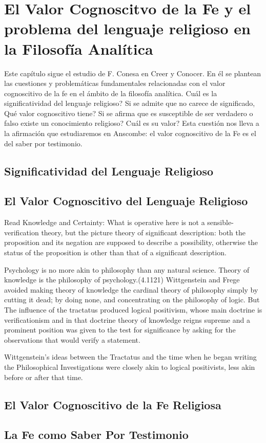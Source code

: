 \documentclass[../main.tex]{subfiles}
\begin{document}
\chapter{El Valor Cognoscitvo de la Fe y el problema del lenguaje religioso en la Filosofía Analítica}



Este capítulo sigue el estudio de F. Conesa en Creer y Conocer. En él se plantean las cuestiones y problemáticas fundamentales relacionadas con el valor cognoscitivo de la fe en el ámbito de la filosofía analítica.  \textquestiondown{}Cuál es la significatividad del lenguaje religioso? Si se admite que no carece de significado, \textquestiondown{}Qué valor cognoscitivo tiene? Si se afirma que es susceptible de ser verdadero o falso \textquestiondown{}existe un conocimiento religioso? \textquestiondown{}Cuál es su valor? Esta cuestión nos lleva a la afirmación que estudiaremos en Anscombe: el valor cognoscitivo de la Fe es el del saber por testimonio.


\section{Significatividad del Lenguaje Religioso}

\section{El Valor Cognoscitivo del Lenguaje Religioso}

Read Knowledge and Certainty:
What is operative here is not a sensible-verification theory, but the picture theory of significant description: both the proposition and its negation are supposed to describe a possibility, otherwise the status of the proposition is other than that of a significant description.

Psychology is no more akin to philosophy than any natural science. Theory of knowledge is the philosophy of psychology.(4.1121)
Wittgenstein and Frege avoided making theory of knowledge the cardinal theory of philosophy simply by cutting it dead; by doing none, and concentrating on the philosophy of logic.
But
The influence of the tractatus produced logical positivism, whose main doctrine is verificationism and in that doctrine theory of knowledge reigns supreme and a prominent position was given to the test for significance by asking for the observations that would verify a statement. 

Wittgenstein's ideas between the Tractatus and the time when he began writing the Philosophical Investigations were closely akin to logical positivists, less akin  before or after that time. 

\section{El Valor Cognoscitivo de la Fe Religiosa}

\section{La Fe como Saber Por Testimonio}
\end{document}
